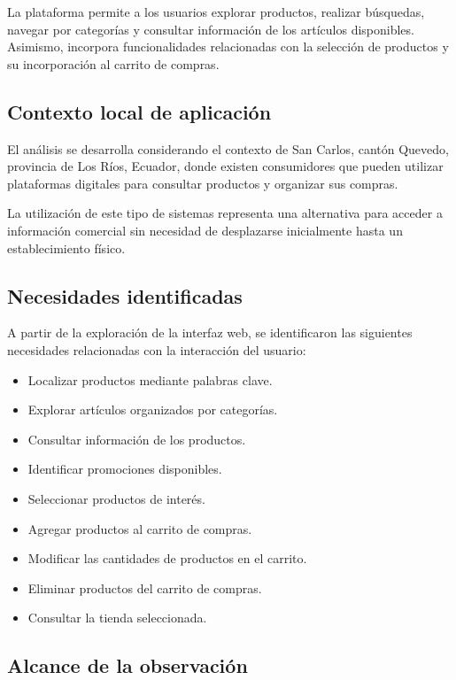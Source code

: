 \documentclass[12pt,a4paper]{article}
\begin{document}
La plataforma permite a los usuarios explorar productos,
realizar búsquedas, navegar por categorías y consultar
información de los artículos disponibles. Asimismo,
incorpora funcionalidades relacionadas con la selección
de productos y su incorporación al carrito de compras.

\subsection{Contexto local de aplicación}

El análisis se desarrolla considerando el contexto de
San Carlos, cantón Quevedo, provincia de Los Ríos,
Ecuador, donde existen consumidores que pueden utilizar
plataformas digitales para consultar productos y
organizar sus compras.

La utilización de este tipo de sistemas representa una
alternativa para acceder a información comercial sin
necesidad de desplazarse inicialmente hasta un
establecimiento físico.

\subsection{Necesidades identificadas}

A partir de la exploración de la interfaz web,
se identificaron las siguientes necesidades
relacionadas con la interacción del usuario:

\begin{itemize}
    \item Localizar productos mediante palabras clave.
    \item Explorar artículos organizados por categorías.
    \item Consultar información de los productos.
    \item Identificar promociones disponibles.
    \item Seleccionar productos de interés.
    \item Agregar productos al carrito de compras.
    \item Modificar las cantidades de productos en el carrito.
    \item Eliminar productos del carrito de compras.
    \item Consultar la tienda seleccionada.
\end{itemize}

\subsection{Alcance de la observación}
\end{document}

